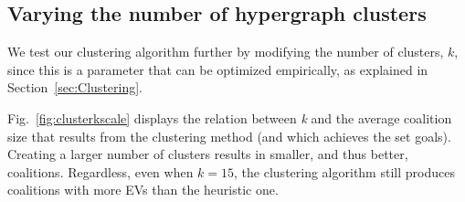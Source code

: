 
\subsection{Varying the number of hypergraph clusters} \label{sec:results_modifications}
We test our clustering algorithm further by modifying the number of clusters, $k$, since this is a parameter that can be optimized empirically, as explained in Section~\ref{sec:Clustering}.

Fig.~\ref{fig:clusterkscale} displays the relation between \textit{k} and the average coalition size that results from the clustering method (and which achieves the set goals). Creating a larger number of clusters results in smaller, and thus better, coalitions. Regardless, even when $k=15$, the clustering algorithm still produces coalitions with more EVs than the heuristic one.%
